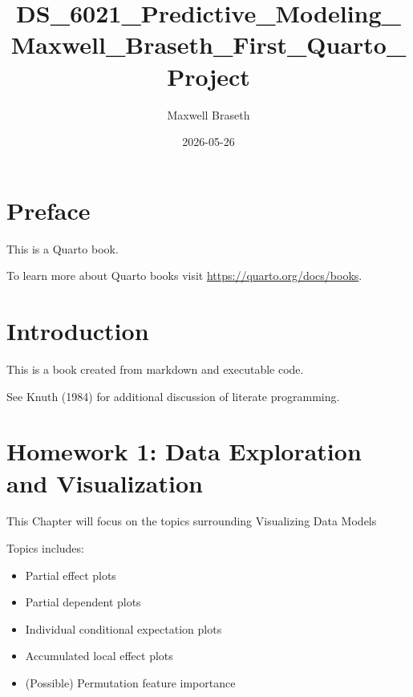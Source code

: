 \documentclass[
  letterpaper,
  DIV=11,
  numbers=noendperiod]{scrreprt}
\title{DS\_6021\_Predictive\_Modeling\_Maxwell\_Braseth\_First\_Quarto\_Project}
\author{Maxwell Braseth}
\date{2026-05-26}
\providecommand{\tightlist}{%
  \setlength{\itemsep}{0pt}\setlength{\parskip}{0pt}}
\renewcommand*\contentsname{Table of contents}
\newcommand\contentsname{Table of contents}
\begin{document}
\maketitle

\renewcommand*\contentsname{Table of contents}
{
\setcounter{tocdepth}{2}
\tableofcontents
}


\chapter*{Preface}\label{preface}


This is a Quarto book.

To learn more about Quarto books visit
\url{https://quarto.org/docs/books}.


\chapter{Introduction}\label{introduction}

This is a book created from markdown and executable code.

See Knuth (1984) for additional discussion of literate programming.


\chapter{Homework 1: Data Exploration and
Visualization}\label{homework-1-data-exploration-and-visualization}

This Chapter will focus on the topics surrounding Visualizing Data
Models

Topics includes:

\begin{itemize}
\tightlist
\item
  Partial effect plots
\item
  Partial dependent plots
\item
  Individual conditional expectation plots
\item
  Accumulated local effect plots
\item
  (Possible) Permutation feature importance
\end{itemize}

\end{document}

